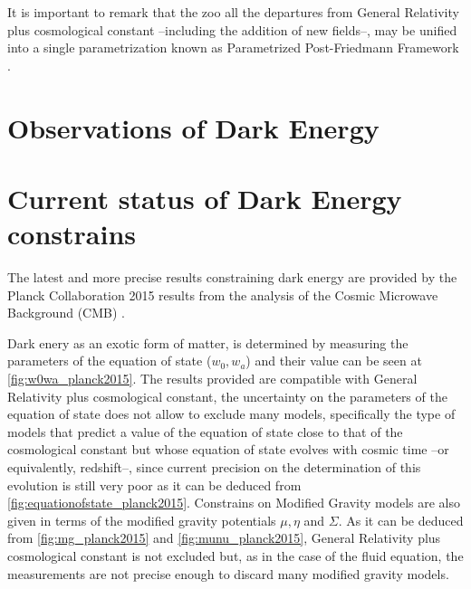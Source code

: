 It is important to remark that the zoo all the departures from General Relativity plus cosmological constant --including the addition of new fields--, may be unified into a single parametrization known as Parametrized Post-Friedmann Framework \cite{2013PhRvD..87b4015B}.

\section{Observations of Dark Energy}

\section{Current status of Dark Energy constrains}
The latest and more precise results constraining dark energy are provided by the Planck Collaboration 2015 results from the analysis of the Cosmic Microwave Background (CMB) \cite{2016A&A...594A..14P}.
\newline

Dark enery as an exotic form of matter, is determined by measuring the parameters of the equation of state ($w_0,w_a$) and their value can be seen at \autoref{fig:w0wa_planck2015}. The results provided are compatible with General Relativity plus cosmological constant, the uncertainty on the parameters of the equation of state does not allow to exclude many models, specifically the type of models that predict a value of the equation of state close to that of the cosmological constant but whose equation of state evolves with cosmic time --or equivalently, redshift--, since current precision on the determination of this evolution is still very poor as it can be deduced from \autoref{fig:equationofstate_planck2015}. Constrains on Modified Gravity models are also given in terms of the modified gravity potentials $\mu,\eta$ and $\Sigma$. As it can be deduced from \autoref{fig:mg_planck2015} and \autoref{fig:munu_planck2015}, General Relativity plus cosmological constant is not excluded but, as in the case of the fluid equation, the measurements are not precise enough to discard many modified gravity models.
\newline

